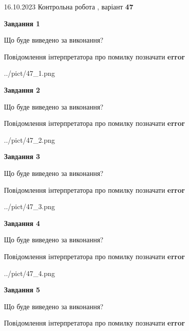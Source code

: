 \documentclass[12pt, ukrainian]{article}
\begin{document}
{\Large{16.10.2023 Контрольна робота , варіант  \No \textbf { 47 }\par}}
{
\begin {large}
{\begin {center}\textbf{Завдання 1}\end {center}}\par
Що буде виведено за виконання? \par
Повідомлення інтерпретатора про помилку позначати \textbf{error}

\begin{center}
	{../pict/47_1.png}
\end{center}
\newpage

{\begin {center}\textbf{Завдання 2}\end {center}}\par
Що буде виведено за виконання? \par
Повідомлення інтерпретатора про помилку позначати \textbf{error}

\begin{center}
	{../pict/47_2.png}
\end{center}
\newpage

{\begin {center}\textbf{Завдання 3}\end {center}}\par
Що буде виведено за виконання? \par
Повідомлення інтерпретатора про помилку позначати \textbf{error}

\begin{center}
	{../pict/47_3.png}
\end{center}
\newpage

{\begin {center}\textbf{Завдання 4}\end {center}}\par
Що буде виведено за виконання? \par
Повідомлення інтерпретатора про помилку позначати \textbf{error}

\begin{center}
	{../pict/47_4.png}
\end{center}
\newpage

{\begin {center}\textbf{Завдання 5}\end {center}}\par
Що буде виведено за виконання? \par
Повідомлення інтерпретатора про помилку позначати \textbf{error}


\end{large}}
\end{document}
